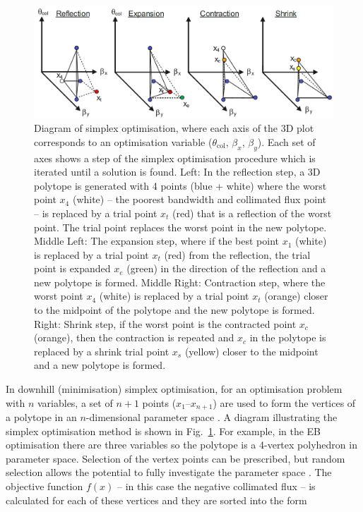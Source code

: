 \documentclass[../main.tex]{subfiles}
\begin{document}
\begin{figure}[!h]
\centering
\includegraphics[width=\textwidth]{Figures/Optimisation_and_Characterisation_of_Inverse_Compton_Scattering_Sources/simplex_fixed_4.pdf}
\caption{Diagram of simplex optimisation, where each axis of the 3D plot corresponds to an optimisation variable ($\theta_{\mathrm{col}}$, $\beta_{x}$, $\beta_{y}$). Each set of axes shows a step of the simplex optimisation procedure which is iterated until a solution is found. Left: In the reflection step, a 3D polytope is generated with 4 points (blue + white) where the worst point $x_{4}$ (white) -- the poorest bandwidth and collimated flux point -- is replaced by a trial point $x_{t}$ (red) that is a reflection of the worst point. The trial point replaces the worst point in the new polytope. Middle Left: The expansion step, where if the best point $x_{1}$ (white) is replaced by a trial point $x_{t}$ (red) from the reflection, the trial point is expanded $x_{e}$ (green) in the direction of the reflection and a new polytope is formed. Middle Right: Contraction step, where the worst point $x_{4}$ (white) is replaced by a trial point $x_{t}$ (orange) closer to the midpoint of the polytope and the new polytope is formed. Right: Shrink step, if the worst point is the contracted point $x_{c}$ (orange), then the contraction is repeated and $x_{c}$ in the polytope is replaced by a shrink trial point $x_{s}$ (yellow) closer to the midpoint and a new polytope is formed. }
\label{fig:simplex_method_diagram}
\end{figure}
In downhill (minimisation) simplex optimisation, for an optimisation problem with $n$ variables, a set of $n+1$ points ($x_{1}$--$x_{n+1}$) are used to form the vertices of a polytope in an $n$-dimensional parameter space \cite{wolfram2021nmaximize}. A diagram illustrating the simplex optimisation method is shown in Fig.~\ref{fig:simplex_method_diagram}. For example, in the EB optimisation there are three variables so the polytope is a 4-vertex polyhedron in parameter space. Selection of the vertex points can be prescribed, but random selection allows the potential to fully investigate the parameter space \cite{koshel2002enhancement}. The objective function $f\left(x\right)$ -- in this case the negative collimated flux -- is calculated for each of these vertices and they are sorted into the form
\end{document}
